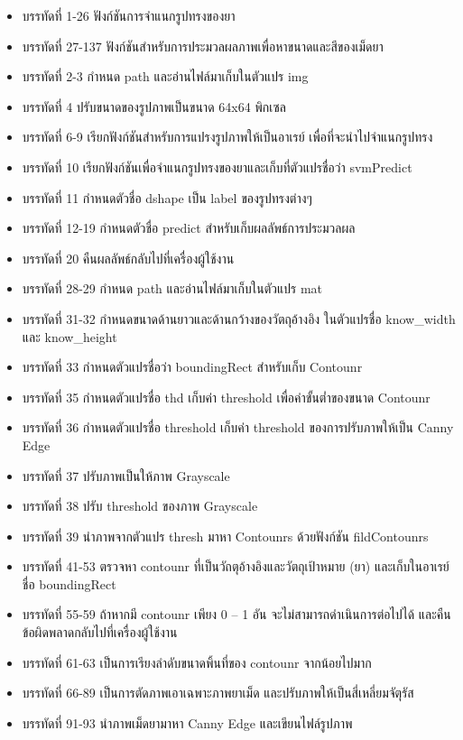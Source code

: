 	\begin{itemize}[label={--}]
		\item บรรทัดที่ 1-26	ฟังก์ชันการจำแนกรูปทรงของยา
		\item บรรทัดที่ 27-137 ฟังก์ชันสำหรับการประมวลผลภาพเพื่อหาขนาดและสีของเม็ดยา
		\item บรรทัดที่ 2-3	กำหนด path และอ่านไฟล์มาเก็บในตัวแปร img
		\item บรรทัดที่ 4	ปรับขนาดของรูปภาพเป็นขนาด 64x64 พิกเซล
		\item บรรทัดที่ 6-9	เรียกฟังก์ชันสำหรับการแปรงรูปภาพให้เป็นอาเรย์ เพื่อที่จะนำไปจำแนกรูปทรง
		\item บรรทัดที่ 10	เรียกฟังก์ชันเพื่อจำแนกรูปทรงของยาและเก็บที่ตัวแปรชื่อว่า svmPredict
		\item บรรทัดที่ 11	กำหนดตัวชื่อ dshape เป็น label ของรูปทรงต่างๆ 
		\item บรรทัดที่ 12-19	กำหนดตัวชื่อ predict สำหรับเก็บผลลัพธ์การประมวลผล
		\item บรรทัดที่ 20	คืนผลลัพธ์กลับไปที่เครื่องผู้ใช้งาน
		\item บรรทัดที่ 28-29 กำหนด path และอ่านไฟล์มาเก็บในตัวแปร mat
		\item บรรทัดที่ 31-32 กำหนดขนาดด้านยาวและด้านกว้างของวัตถุอ้างอิง ในตัวแปรชื่อ {know\_width} และ {know\_height}
		\item บรรทัดที่ 33	กำหนดตัวแปรชื่อว่า boundingRect สำหรับเก็บ Contounr
		\item บรรทัดที่ 35	กำหนดตัวแปรชื่อ thd เก็บค่า threshold เพื่อค่าขั้นต่ำของขนาด Contounr 
		\item บรรทัดที่ 36	กำหนดตัวแปรชื่อ threshold เก็บค่า threshold ของการปรับภาพให้เป็น Canny Edge
		\item บรรทัดที่ 37	ปรับภาพเป็นให้ภาพ Grayscale
		\item บรรทัดที่ 38	ปรับ threshold ของภาพ Grayscale
		\item บรรทัดที่ 39	นำภาพจากตัวแปร thresh มาหา Contounrs ด้วยฟังก์ชัน fildContounrs 
		\item บรรทัดที่ 41-53	ตรวจหา contounr ที่เป็นวัถตุอ้างอิงและวัตถุเป้าหมาย (ยา) และเก็บในอาเรย์ชื่อ boundingRect 
		\item บรรทัดที่ 55-59	ถ้าหากมี contounr เพียง 0 – 1 อัน จะไม่สามารถดำเนินการต่อไปได้ และคืนข้อผิดพลาดกลับไปที่เครื่องผู้ใช้งาน
		\item บรรทัดที่ 61-63	เป็นการเรียงลำดับขนาดพิ้นที่ของ contounr จากน้อยไปมาก 
		\item บรรทัดที่ 66-89 เป็นการตัดภาพเอาเฉพาะภาพยาเม็ด และปรับภาพให้เป็นสี่เหลี่ยมจัตุรัส
		\item บรรทัดที่ 91-93 นำภาพเม็ดยามาหา Canny Edge และเขียนไฟล์รูปภาพ

\end{itemize}
